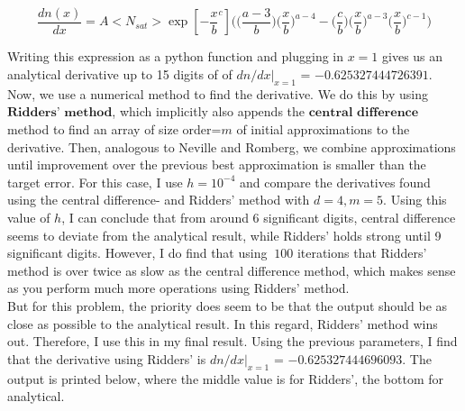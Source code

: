 \begin{equation}
	\frac{dn(x)}{dx} = A <N_{sat}> \exp[-\frac{x}{b}^{c}]\Bigg(\Big(\frac{a-3}{b}\Big) \Big(\frac{x}{b}\Big)^{a-4} - \Big(\frac{c}{b}\Big) \Big(\frac{x}{b}\Big)^{a-3} \Big(\frac{x}{b}\Big)^{c-1}\Bigg)
\end{equation}

Writing this expression as a python function and plugging in $x=1$ gives us an analytical derivative up to 15 digits of of $dn/dx |_{x=1}$ = $-0.625327444726391$. Now, we use a numerical method to find the derivative. We do this by using $\textbf{Ridders' method}$, which implicitly also appends the $\textbf{central difference}$ method to find an array of size order=$m$ of initial approximations to the derivative. Then, analogous to Neville and Romberg, we combine approximations until improvement over the previous best approximation is smaller than the target error. For this case, I use $h = 10^{-4}$ and compare the derivatives found using the central difference- and Ridders' method with $d= 4, m=5$. Using this value of $h$, I can conclude that from around 6 significant digits, central difference seems to deviate from the analytical result, while Ridders' holds strong until 9 significant digits. However, I do find that using $~100$ iterations that Ridders' method is over twice as slow as the central difference method, which makes sense as you perform much more operations using Ridders' method.\\

But for this problem, the priority does seem to be that the output should be as close as possible to the analytical result. In this regard, Ridders' method wins out. Therefore, I use this in my final result. Using the previous parameters, I find that the derivative using Ridders' is $dn/dx |_{x=1}$ = $-0.625327444696093$. The output is printed below, where the middle value is for Ridders', the bottom for analytical. 

